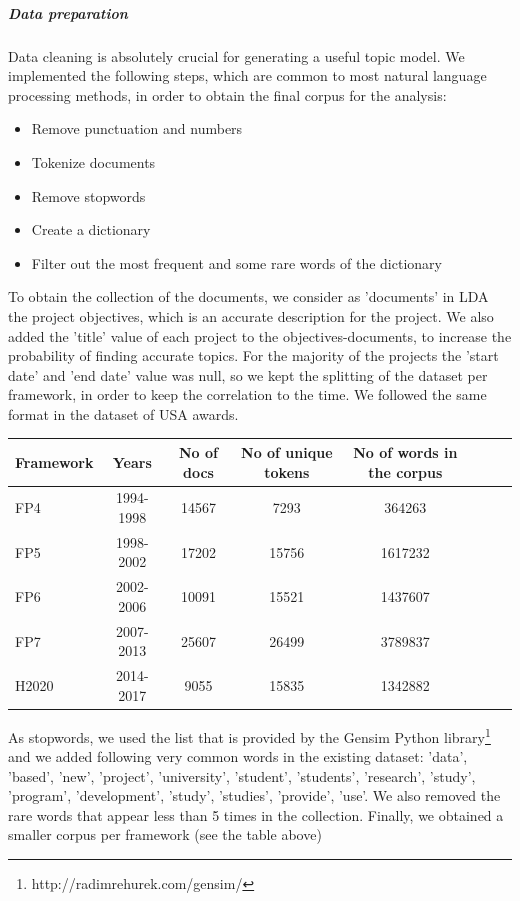 \documentclass[12pt]{report}
\begin{document}
\subparagraph{Data preparation}

Data cleaning is absolutely crucial for generating a useful topic model. 
We implemented the following steps, which are common to most natural 
language processing methods, in order to obtain the final corpus for the 
analysis:

\begin{itemize}
\item Remove punctuation and numbers
\item Tokenize documents
\item Remove stopwords
\item Create a dictionary
\item Filter out the most frequent and some rare words of the dictionary
\end{itemize}

To obtain the collection of the documents, we consider as 'documents' in LDA the
project objectives, which is an accurate description for the project. We also
added the 'title' value of each project to the objectives-documents, to increase
the probability of finding accurate topics. For the majority of the projects the
'start date' and 'end date' value was null, so we kept the splitting of the
dataset per framework, in order to keep the correlation to the time. We followed
the same format in the dataset of USA awards.


\begin{center}
\begin{tabular}{l*{6}{c}r}
Framework & Years & No of docs & No of unique tokens & No of words in the corpus \\
\hline
FP4 & 1994-1998 & 14567 & 7293 & 364263 \\
FP5 & 1998-2002 & 17202 & 15756 & 1617232 \\
FP6 & 2002-2006 & 10091 & 15521 & 1437607 \\
FP7 & 2007-2013 & 25607 & 26499 & 3789837 \\
H2020 & 2014-2017 & 9055 & 15835 & 1342882 \\
\end{tabular}
\end{center}

As stopwords, we used the list that is provided by the Gensim Python
library\footnote{http://radimrehurek.com/gensim/} and we added following very
common words in the existing dataset: 'data', 'based', 'new', 'project',
'university', 'student', 'students', 'research', 'study', 'program',
'development', 'study', 'studies', 'provide', 'use'. We also removed the rare
words that appear less than 5 times in the collection. Finally, we obtained a
smaller corpus per framework (see the table above)
\end{document}
